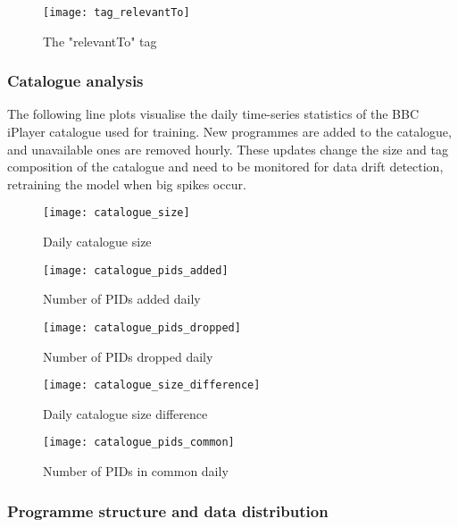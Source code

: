 \begin{figure}[H]
  \centering
  \texttt{[image: tag\_relevantTo]}
  \caption{The "relevantTo" tag}
  \label{fig:tag_relevantTo}
\end{figure}

\subsubsection{Catalogue analysis}

The following line plots visualise the daily time-series statistics of the BBC iPlayer catalogue used for training.
New programmes are added to the catalogue, and unavailable ones are removed hourly.
These updates change the size and tag composition of the catalogue and need to be monitored for data drift detection,
retraining the model when big spikes occur.

\begin{figure}[H]
  \centering
  \texttt{[image: catalogue\_size]}
  \caption{Daily catalogue size}
  \label{fig:catalogue_size}
\end{figure}

\begin{figure}[H]
  \centering
  \texttt{[image: catalogue\_pids\_added]}
  \caption{Number of PIDs added daily}
  \label{fig:catalogue_pids_added}
\end{figure}

\begin{figure}[H]
  \centering
  \texttt{[image: catalogue\_pids\_dropped]}
  \caption{Number of PIDs dropped daily}
  \label{fig:catalogue_pids_dropped}
\end{figure}

\begin{figure}[H]
  \centering
  \texttt{[image: catalogue\_size\_difference]}
  \caption{Daily catalogue size difference}
  \label{fig:catalogue_size_diff}
\end{figure}

\begin{figure}[H]
  \centering
  \texttt{[image: catalogue\_pids\_common]}
  \caption{Number of PIDs in common daily}
  \label{fig:catalogue_pids_common}
\end{figure}

\subsubsection{Programme structure and data distribution}

